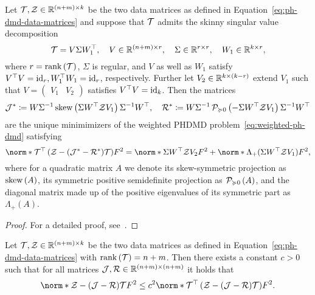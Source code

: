 \begin{lemma}\label{lem:weighted-ph-dmd-solution}
    Let $\mcl{T}, \mcl{Z} \in \bb{R}^{(n + m) \times k}$ be the two data matrices as defined in Equation~\eqref{eq:ph-dmd-data-matrices} and suppose that $\mcl{T}$ admits the skinny singular value decomposition
    \begin{equation*}
        \mcl{T} = V \Sigma W_1\trans,\quad V \in \bb{R}^{(n + m) \times r},\quad \Sigma \in \bb{R}^{r \times r},\quad W_1 \in \bb{R}^{k \times r},
    \end{equation*}
    where $r = \rank{\mcl{T}}$, $\Sigma$ is regular, and $V$ as well as $W_1$ satisfy $V\trans V = \id[r], W_1\trans W_1 = \id[r]$, respectively.
    Further let $V_2 \in \bb{R}^{k \times (k - r)}$ extend $V_1$ such that $V = \begin{pmatrix}
        V_1 & V_2
    \end{pmatrix}$ satisfies $V\trans V = \id[k]$.
    Then the matrices
    \begin{equation*}
        \mcl{J}^\ast \coloneqq W \Sigma\inv \sksym{\Sigma W\trans \mcl{Z} V_1} \Sigma\inv W\trans,\quad \mcl{R}^\ast \coloneqq W \Sigma\inv \psd{- \Sigma W\trans \mcl{Z} V_1} \Sigma\inv W\trans
    \end{equation*}
    are the unique minimimizers of the weighted \ac{PHDMD} problem~\eqref{eq:weighted-ph-dmd} satisfying
    \begin{equation*}
        \norm*{\mcl{T}\trans \left( \mcl{Z} - (\mcl{J}^\ast - \mcl{R}^\ast) \mcl{T} \right)}{F}^2 = \norm*{\Sigma W\trans \mcl{Z} V_2}{F}^2 + \norm*{\Lambda_+(\Sigma W\trans \mcl{Z} V_1)}{F}^2,
    \end{equation*}
    where for a quadratic matrix $A$ we denote its skew-symmetric projection as $\sksym{A}$, its symmetric positive semidefinite projection as $\psd{A}$, and the diagonal matrix made up of the positive eigenvalues of its symmetric part as $\Lambda_+(A)$.
\end{lemma}

\begin{proof}
    For a detailed proof, see~\cite[Proof of Theorem~3.7 and Lemma~3.10]{Morandin2023}.
\end{proof}

\begin{lemma}
    Let $\mcl{T}, \mcl{Z} \in \bb{R}^{(n + m) \times k}$ be the two data matrices as defined in Equation~\eqref{eq:ph-dmd-data-matrices} with $\rank{\mcl{T}} = n + m$.
    Then there exists a constant $c > 0$ such that for all matrices $\mcl{J}, \mcl{R} \in \bb{R}^{(n + m) \times (n + m)}$ it holds that
    \begin{equation*}
        \norm*{\mcl{Z} - (\mcl{J} - \mcl{R}) \mcl{T}}{F}^2 \leq c^2 \norm*{\mcl{T}\trans \left( \mcl{Z} - (\mcl{J} - \mcl{R}) \mcl{T} \right)}{F}^2.
    \end{equation*}
\end{lemma}

